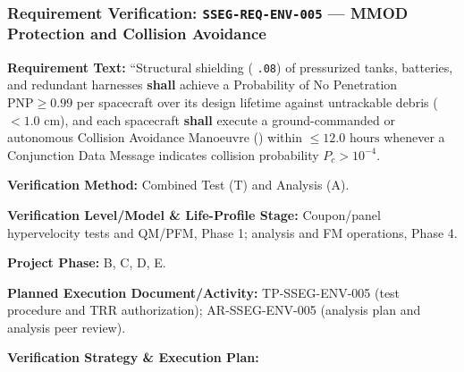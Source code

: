 \subsubsection{Requirement Verification: \texttt{SSEG-REQ-ENV-005} --- MMOD Protection and Collision Avoidance}
\label{ver:SSEG-REQ-ENV-005}
\textbf{Requirement Text:} ``Structural shielding ( \texttt{.08}) of pressurized tanks, batteries, and redundant harnesses \textbf{shall} achieve a Probability of No Penetration $\text{PNP} \ge 0.99$ per spacecraft over its design lifetime against untrackable debris ($< 1.0\text{ cm}$), and each spacecraft \textbf{shall} execute a ground-commanded or autonomous Collision Avoidance Manoeuvre () within $\le 12.0\text{ hours}$ whenever a Conjunction Data Message indicates collision probability $P_c > 10^{-4}$.
\par\textbf{Verification Method:} Combined Test (T) and Analysis (A).
\par\textbf{Verification Level/Model \& Life-Profile Stage:} Coupon/panel hypervelocity tests and QM/PFM, Phase 1; analysis and FM operations, Phase 4.
\par\textbf{Project Phase:} B, C, D, E.
\par\textbf{Planned Execution Document/Activity:} TP-SSEG-ENV-005 (test procedure and TRR authorization); AR-SSEG-ENV-005 (analysis plan and analysis peer review).
\par\textbf{Verification Strategy \& Execution Plan:}
